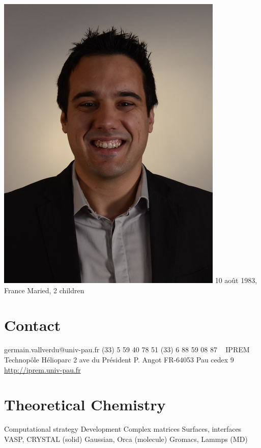 \documentclass{cv-style}     %
\begin{document}


\begin{aside}
    \includegraphics[width=.8\columnwidth]{img/gvallver-red2}
    10 août 1983, France
    Maried, 2 children
    \section{Contact}
    germain.vallverdu@univ-pau.fr
    (33) 5 59 40 78 51
    (33) 6 88 59 08 87
    ~
    {\color{gray} \faFlask} IPREM
    Technopôle Hélioparc
    2 ave du Président P. Angot
    FR-64053 Pau cedex 9
    \href{http://iprem.univ-pau.fr/fr/index.html}{http://iprem.univ-pau.fr}
    \section{Theoretical Chemistry}
    Computational strategy
    Development
    Complex matrices
    Surfaces, interfaces
    VASP, CRYSTAL (solid)
    Gaussian, Orca (molecule)
    Gromacs, Lammps (MD)

\end{aside}
\end{document}

